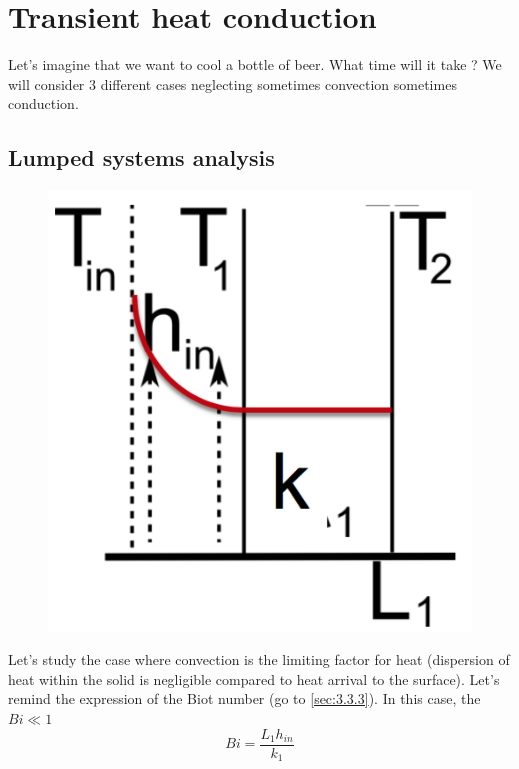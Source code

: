 
\chapter{Transient heat conduction}
	Let's imagine that we want to cool a bottle of beer. What time will it take ? We will consider 3 different cases neglecting sometimes convection sometimes conduction. 
	
\section{Lumped systems analysis}
	\begin{figure}
	\vspace{-5mm}
	\includegraphics[scale=0.3]{ch3/8}
	\end{figure}	
	Let's study the case where convection is the limiting factor for heat (dispersion of heat within the solid is negligible compared to heat arrival to the surface). Let's remind the expression of the Biot number (go to \autoref{sec:3.3.3}). In this case, the $Bi \ll 1$
	\begin{equation}
		Bi = \frac{L_1h_{in}}{k_1}
	\end{equation}
	
